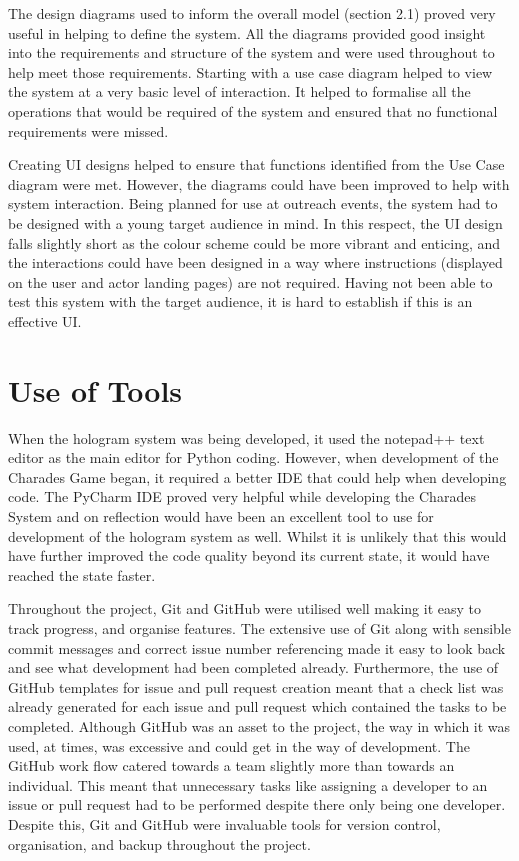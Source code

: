 The design diagrams used to inform the overall model (section 2.1) proved very useful in helping to define the system. All the diagrams provided good insight into the requirements and structure of the system and were used throughout to help meet those requirements. Starting with a use case diagram helped to view the system at a very basic level of interaction. It helped to formalise all the operations that would be required of the system and ensured that no functional requirements were missed.

Creating UI designs helped to ensure that functions identified from the Use Case diagram were met. However, the diagrams could have been improved to help with system interaction. Being planned for use at outreach events, the system had to be designed with a young target audience in mind. In this respect, the UI design falls slightly short as the colour scheme could be more vibrant and enticing, and the interactions could have been designed in a way where instructions (displayed on the user and actor landing pages) are not required. Having not been able to test this system with the target audience, it is hard to establish if this is an effective UI.

\section{Use of Tools}
When the hologram system was being developed, it used the notepad++ text editor as the main editor for Python coding. However, when development of the Charades Game began, it required a better IDE that could help when developing code. The PyCharm IDE proved very helpful while developing the Charades System and on reflection would have been an excellent tool to use for development of the hologram system as well. Whilst it is unlikely that this would have further improved the code quality beyond its current state, it would have reached the state faster.

Throughout the project, Git and GitHub were utilised well making it easy to track progress, and organise features. The extensive use of Git along with sensible commit messages and correct issue number referencing made it easy to look back and see what development had been completed already. Furthermore, the use of GitHub templates for issue and pull request creation meant that a check list was already generated for each issue and pull request which contained the tasks to be completed. Although GitHub was an asset to the project, the way in which it was used, at times, was excessive and could get in the way of development. The GitHub work flow catered towards a team slightly more than towards an individual. This meant that unnecessary tasks like assigning a developer to an issue or pull request had to be performed despite there only being one developer. Despite this, Git and GitHub were invaluable tools for version control, organisation, and backup throughout the project. 

